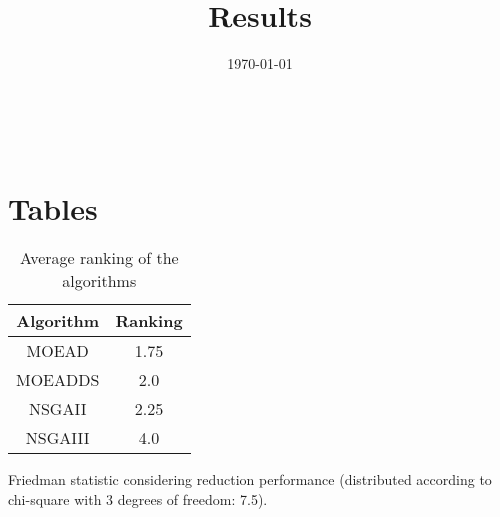 \documentclass{article}
\title{Results}
\author{}
\date{\today}
\begin{document}
\oddsidemargin 0in \topmargin 0in\maketitle
\
\section{Tables}
\begin{table}[!htp]
\centering
\caption{Average ranking of the algorithms}
\begin{tabular}{c|c}
Algorithm&Ranking\\
\hline
MOEAD&1.75\\
MOEADDS&2.0\\
NSGAII&2.25\\
NSGAIII&4.0\\
\end{tabular}
\end{table}


Friedman statistic considering reduction performance (distributed according to chi-square with 3 degrees of freedom: 7.5).
\end{document}
